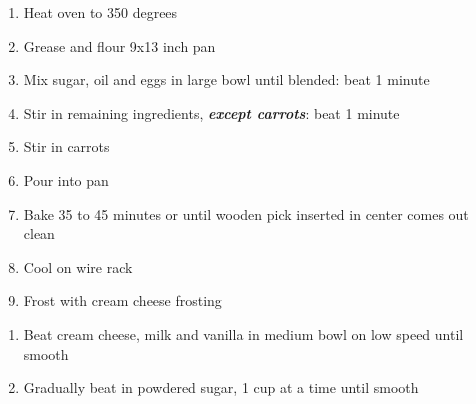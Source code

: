 \documentclass[letter]{recipe}
\begin{document}

\begin{enumerate}
\addtolength{\itemindent}{2em}
 \item Heat oven to 350 degrees
 \item Grease and flour 9x13 inch pan
 \item Mix sugar, oil and eggs in large bowl until blended: beat 1 minute
 \item Stir in remaining ingredients, \emph{\textbf{except carrots}}: beat 1 minute
 \item Stir in carrots
 \item Pour into pan
 \item Bake 35 to 45 minutes or until wooden pick inserted in center
   comes out clean
 \item Cool on wire rack
 \item Frost with cream cheese frosting
\end{enumerate}


\begin{enumerate}
\addtolength{\itemindent}{2em}
\item Beat cream cheese, milk and vanilla in medium bowl on low speed
  until smooth
\item Gradually beat in powdered sugar, 1 cup at a time until smooth
\end{enumerate}
\end{document}
